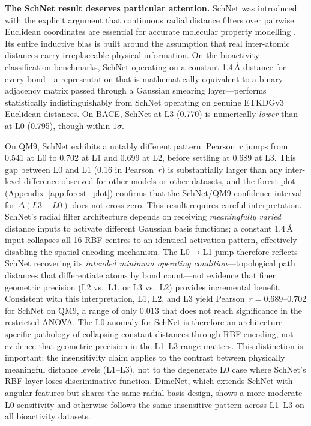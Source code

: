 \documentclass[pdflatex,sn-vancouver-num]{sn-jnl}%
\theoremstyle{thmstyleone}%
\theoremstyle{thmstyletwo}%
\theoremstyle{thmstylethree}%
\begin{document}
\textbf{The SchNet result deserves particular attention.}  SchNet was
introduced with the explicit argument that continuous radial distance
filters over pairwise Euclidean coordinates are essential for accurate
molecular property modelling \cite{schutt2018schnet}.  Its entire
inductive bias is built around the assumption that real inter-atomic
distances carry irreplaceable physical information.  On the bioactivity
classification benchmarks, SchNet operating on a constant 1.4\,\AA{}
distance for every bond---a representation that is mathematically
equivalent to a binary adjacency matrix passed through a Gaussian
smearing layer---performs statistically indistinguishably from SchNet
operating on genuine ETKDGv3 Euclidean distances.  On BACE, SchNet at
L3 (0.770) is numerically \emph{lower} than at L0 (0.795), though
within $1\sigma$.\

On QM9, SchNet exhibits a notably different pattern: Pearson~$r$ jumps
from 0.541 at L0 to 0.702 at L1 and 0.699 at L2, before settling at
0.689 at L3.  This gap between L0 and L1 (0.16 in Pearson~$r$) is
substantially larger than any inter-level difference observed for
other models or other datasets, and the forest plot (Appendix~\ref{app:forest_plot}) confirms
that the SchNet/QM9 confidence interval for $\Delta(L3 - L0)$ does not
cross zero.  This result requires careful interpretation.  SchNet's
radial filter architecture depends on receiving \emph{meaningfully
varied} distance inputs to activate different Gaussian basis functions;
a constant 1.4\,\AA{} input collapses all 16 RBF centres to an identical
activation pattern, effectively disabling the spatial encoding
mechanism.  The L0$\to$L1 jump therefore reflects SchNet recovering its
\emph{intended minimum operating condition}---topological path distances
that differentiate atoms by bond count---not evidence that finer
geometric precision (L2 vs.\  L1, or L3 vs.\ L2) provides incremental
benefit.  Consistent with this interpretation, L1, L2, and L3 yield
Pearson~$r = 0.689$--$0.702$ for SchNet on QM9, a range of only 0.013
that does not reach significance in the restricted ANOVA.  The L0
anomaly for SchNet is therefore an architecture-specific pathology of
collapsing constant distances through RBF encoding, not evidence that
geometric precision in the L1--L3 range matters.  This distinction
is important: the insensitivity claim applies to the contrast
between physically meaningful distance levels (L1--L3), not to the
degenerate L0 case where SchNet's RBF layer loses discriminative
function.  DimeNet, which extends SchNet with angular features but
shares the same radial basis design, shows a more moderate L0
sensitivity and otherwise follows the same insensitive pattern across
L1--L3 on all bioactivity datasets.
\end{document}
